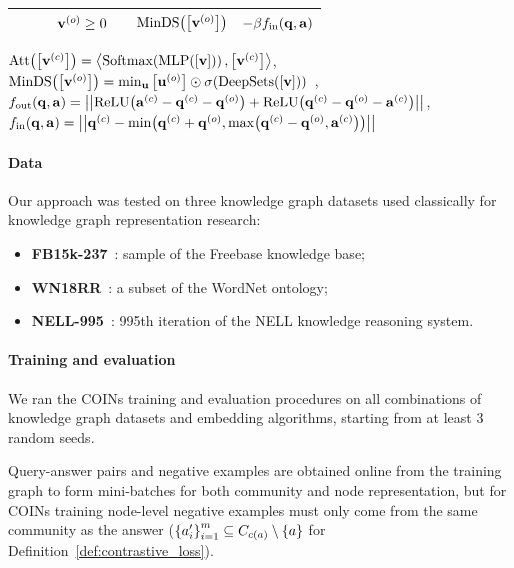\begin{table}[H]
\begin{adjustbox}{width=\textwidth}
\begin{tabular}{lcccccc}
  &  &  & $\mathbf{v}^{\mathopen{}\left(o\right)} \geq 0$ & & $\text{MinDS}\mathopen{}\left(\mathopen{}\left[\mathbf{v}^{\mathopen{}\left(o\right)}\right]\right)$  & $-\beta f_{\text{in}}\mathopen{}\left(\mathbf{q},\mathbf{a}\right)$  \\
\bottomrule
\end{tabular}
\end{adjustbox}
$\text{Att}\mathopen{}\left(\mathopen{}\left[\mathbf{v}^{\mathopen{}\left(c\right)}\right]\right)=\mathopen{}\left\langle \text{Softmax}\mathopen{}\left(\text{MLP}\mathopen{}\left(\mathopen{}\left[\mathbf{v}\right]\right)\right), \mathopen{}\left[\mathbf{v}^{\mathopen{}\left(c\right)}\right] \right\rangle$, \\$\text{MinDS}\mathopen{}\left(\mathopen{}\left[\mathbf{v}^{\mathopen{}\left(o\right)}\right]\right) = \min_{\mathbf{u}}{\mathopen{}\left[\mathbf{u}^{\mathopen{}\left(o\right)}\right]} \odot \sigma\mathopen{}\left(\text{DeepSets}\mathopen{}\left(\mathopen{}\left[\mathbf{v}\right]\right)\right)$~\cite{zaheer_deep_2017,hamilton_embedding_2018}, \\
$f_{\text{out}}\mathopen{}\left(\mathbf{q},\mathbf{a}\right) = \mathopen{}\left|\mathopen{}\left|\text{ReLU}\mathopen{}\left(\mathbf{a}^{\mathopen{}\left(c\right)} - \mathbf{q}^{\mathopen{}\left(c\right)} - \mathbf{q}^{\mathopen{}\left(o\right)}\right) + \text{ReLU}\mathopen{}\left(\mathbf{q}^{\mathopen{}\left(c\right)} - \mathbf{q}^{\mathopen{}\left(o\right)} - \mathbf{a}^{\mathopen{}\left(c\right)}\right)\right|\right|$,\\
$f_{\text{in}}\mathopen{}\left(\mathbf{q},\mathbf{a}\right) = \mathopen{}\left|\mathopen{}\left|\mathbf{q}^{\mathopen{}\left(c\right)} - \min\mathopen{}\left(\mathbf{q}^{\mathopen{}\left(c\right)} + \mathbf{q}^{\mathopen{}\left(o\right)}, \max\mathopen{}\left(\mathbf{q}^{\mathopen{}\left(c\right)} - \mathbf{q}^{\mathopen{}\left(o\right)},\mathbf{a}^{\mathopen{}\left(c\right)}\right)\right)\right|\right|$
\end{table}

\paragraph{Data}

Our approach was tested on three knowledge graph datasets used classically for knowledge graph representation research:
\begin{itemize}
    \item \textbf{FB15k-237}~\cite{toutanova_observed_2015}: sample of the Freebase knowledge base;
    \item \textbf{WN18RR}~\cite{dettmers_convolutional_2018}: a subset of the WordNet ontology;
    \item \textbf{NELL-995}~\cite{xiong_deeppath_2017}: 995th iteration of the NELL knowledge reasoning system.
\end{itemize}

\paragraph{Training and evaluation}
We ran the COINs training and evaluation procedures on all combinations of knowledge graph datasets and embedding algorithms, starting from at least 3 random seeds. 

Query-answer pairs and negative examples are obtained online from the training graph to form mini-batches for both community and node representation, but for COINs training node-level negative examples must only come from the same community as the answer ($\mathopen{}\left\{a'_i\right\}_{i=1}^m \subseteq C_{c\mathopen{}\left(a\right)}\setminus\mathopen{}\left\{a\right\}$ for Definition~\ref{def:contrastive_loss}). 

